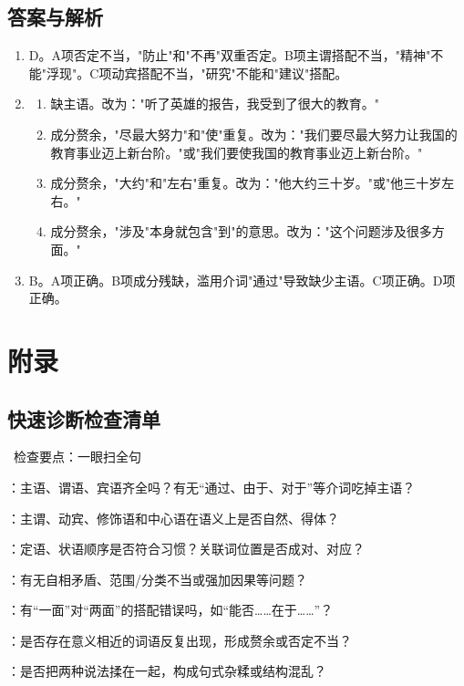 \documentclass[a4paper,12pt]{ctexrep}
\newcommand{\tipicon}{\textcolor{secondary}{\faLightbulb}}
\begin{document}
\section{答案与解析}
\begin{enumerate}
    \item \heiti D。A项否定不当，"防止"和"不再"双重否定。B项主谓搭配不当，"精神"不能"浮现"。C项动宾搭配不当，"研究"不能和"建议"搭配。
    \item 
    \begin{enumerate}
        \item 缺主语。改为："听了英雄的报告，我受到了很大的教育。"
        \item 成分赘余，"尽最大努力"和"使"重复。改为："我们要尽最大努力让我国的教育事业迈上新台阶。"或"我们要使我国的教育事业迈上新台阶。"
        \item 成分赘余，"大约"和"左右"重复。改为："他大约三十岁。"或"他三十岁左右。"
        \item 成分赘余，"涉及"本身就包含"到"的意思。改为："这个问题涉及很多方面。"
    \end{enumerate}
    \item \heiti B。A项正确。B项成分残缺，滥用介词"通过"导致缺少主语。C项正确。D项正确。
\end{enumerate}

\appendix
\chapter{附录}
\section{快速诊断检查清单}
\begin{NoteChecklist}{\tipicon\ 检查要点：一眼扫全句}
  \item {}：主语、谓语、宾语齐全吗？有无“通过、由于、对于”等介词吃掉主语？
  \item {}：主谓、动宾、修饰语和中心语在语义上是否自然、得体？
  \item {}：定语、状语顺序是否符合习惯？关联词位置是否成对、对应？
  \item {}：有无自相矛盾、范围/分类不当或强加因果等问题？
  \item {}：有“一面”对“两面”的搭配错误吗，如“能否……在于……”？
  \item {}：是否存在意义相近的词语反复出现，形成赘余或否定不当？
  \item {}：是否把两种说法揉在一起，构成句式杂糅或结构混乱？
\end{NoteChecklist}
\end{document}

